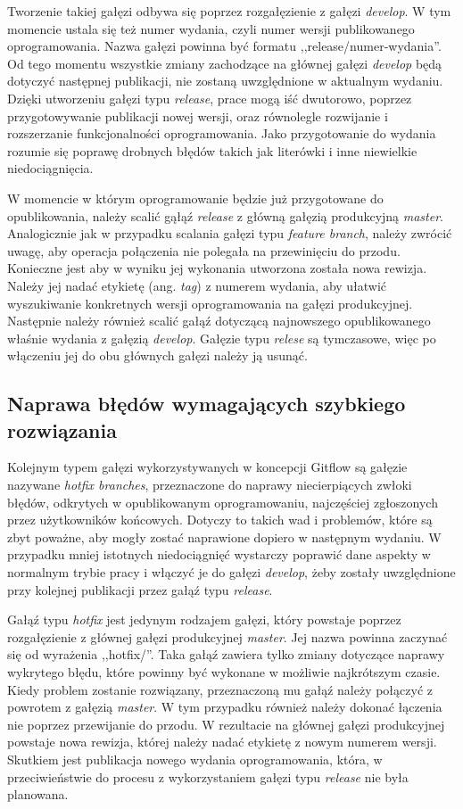 \documentclass[11pt,a4paper,polish,thesis]{dcsbook}
\begin{document}
	Tworzenie takiej gałęzi odbywa się poprzez rozgałęzienie z gałęzi \textit{develop}. W tym momencie ustala się też numer wydania, czyli numer wersji publikowanego oprogramowania. Nazwa gałęzi powinna być formatu ,,release/numer-wydania''.
	Od tego momentu wszystkie zmiany zachodzące na głównej gałęzi \textit{develop} będą dotyczyć następnej publikacji, nie zostaną uwzględnione w aktualnym wydaniu. Dzięki utworzeniu gałęzi typu \textit{release}, prace mogą iść dwutorowo,  poprzez przygotowywanie publikacji nowej wersji, oraz równolegle rozwijanie i rozszerzanie funkcjonalności oprogramowania. Jako przygotowanie do wydania rozumie się poprawę drobnych błędów takich jak literówki i inne niewielkie niedociągnięcia.
	
	W momencie w którym oprogramowanie będzie już przygotowane do opublikowania, należy scalić gąłąź \textit{release} z główną gałęzią produkcyjną \textit{master}. Analogicznie jak w przypadku scalania gałęzi typu \textit{feature branch}, należy  zwrócić uwagę, aby operacja połączenia nie polegała na przewinięciu do przodu. Konieczne jest aby w wyniku jej wykonania utworzona została nowa rewizja. Należy jej nadać etykietę (ang. \textit{tag}) z numerem wydania, aby ułatwić wyszukiwanie konkretnych wersji oprogramowania na gałęzi produkcyjnej. Następnie należy również scalić gałąź dotyczącą najnowszego opublikowanego właśnie wydania z gałęzią \textit{develop}. Gałęzie typu \textit{relese} są tymczasowe, więc po włączeniu jej do obu głównych gałęzi należy ją usunąć.
	
	\subsection{Naprawa błędów wymagających szybkiego rozwiązania}
	
	Kolejnym typem gałęzi wykorzystywanych w koncepcji Gitflow są gałęzie nazywane \textit{hotfix branches}, przeznaczone do naprawy niecierpiących zwłoki błędów, odkrytych w opublikowanym oprogramowaniu, najczęściej zgłoszonych przez użytkowników końcowych. Dotyczy to takich wad i problemów, które są zbyt poważne, aby mogły zostać naprawione dopiero w następnym wydaniu. W przypadku mniej istotnych niedociągnięć wystarczy poprawić dane aspekty w normalnym trybie pracy i włączyć je do gałęzi \textit{develop}, żeby zostały uwzględnione przy kolejnej publikacji przez gałąź typu \textit{release}. 
	
	Gałąź typu \textit{hotfix} jest jedynym rodzajem gałęzi, który powstaje poprzez rozgałęzienie z głównej gałęzi produkcyjnej \textit{master}. Jej nazwa powinna zaczynać się od wyrażenia ,,hotfix/''. Taka gałąź zawiera tylko zmiany dotyczące naprawy wykrytego błędu, które powinny być wykonane w możliwie najkrótszym czasie. Kiedy problem zostanie rozwiązany, przeznaczoną mu gałąź należy połączyć z powrotem z gałęzią \textit{master}. W tym przypadku również należy dokonać łączenia nie poprzez przewijanie do przodu. W rezultacie na głównej gałęzi produkcyjnej powstaje nowa rewizja, której należy nadać etykietę z nowym numerem wersji. Skutkiem jest publikacja nowego wydania oprogramowania, która, w przeciwieństwie do procesu z wykorzystaniem gałęzi typu \textit{release} nie była planowana. 
	
\end{document}
